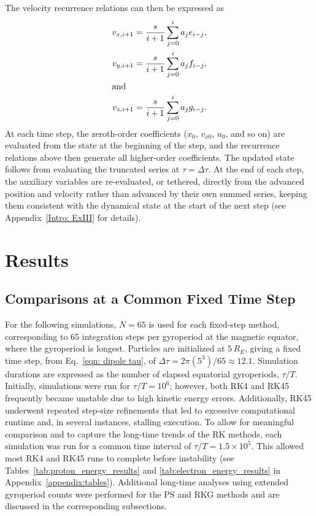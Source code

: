 \documentclass[draft]{agujournal2019}
\begin{document}
The velocity recurrence relations can then be expressed as
        \begin{align*}
            v_{x, i+1} &=  \frac{s}{i+1} \sum_{j=0}^i a_j e_{i-j}, \\
            v_{y, i+1} &=   \frac{s}{i+1} \sum_{j=0}^i a_j f_{i-j}, \\
      \intertext{and}
            v_{z, i+1} &=   \frac{s}{i+1} \sum_{j=0}^i a_j g_{i-j}.
        \end{align*}
At each time step, the zeroth-order coefficients ($x_0$, $v_{x0}$, $u_0$, and so on) are evaluated from the state at the beginning of the step, and the recurrence relations above then generate all higher-order coefficients. The updated state follows from evaluating the truncated series at $\tau = \Delta\tau$. At the end of each step, the auxiliary variables are re-evaluated, or tethered, directly from the advanced position and velocity rather than advanced by their own summed series, keeping them consistent with the dynamical state at the start of the next step (see Appendix~\ref{Intro: ExIII} for details).

\section{Results}\label{SEC:results}

\subsection{Comparisons at a Common Fixed Time Step}
For the following simulations, $N=65$ is used for each fixed-step method, corresponding to 65 integration steps per gyroperiod at the magnetic equator, where the gyroperiod is longest. Particles are initialized at $5\,R_E$, giving a fixed time step, from Eq.~\eqref{eqn: dipole tau}, of $\Delta\tau=2\pi(5^3)/65\approx12.1$. Simulation durations are expressed as the number of elapsed equatorial gyroperiods, $\tau/T$. Initially, simulations were run for $\tau/T=10^{6}$; however, both RK4 and RK45 frequently became unstable due to high kinetic energy errors. Additionally, RK45 underwent repeated step-size refinements that led to excessive computational runtime and, in several instances, stalling execution. To allow for meaningful comparison and to capture the long-time trends of the RK methods, each simulation was run for a common time interval of $\tau/T = 1.5\times 10^{5}$. This allowed most RK4 and RK45 runs to complete before instability (see Tables~\ref{tab:proton_energy_results} and \ref{tab:electron_energy_results} in Appendix~\ref{appendix:tables}). Additional long-time analyses using extended gyroperiod counts were performed for the PS and RKG methods and are discussed in the corresponding subsections. 
\end{document}
